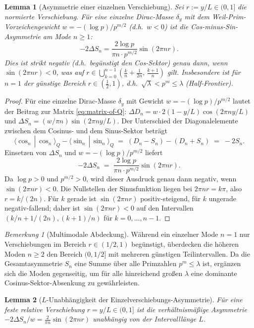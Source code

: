 \documentclass[11pt,a4paper]{article}
\newtheorem{lemma}[lemma]{Lemma}
\theoremstyle{remark}
\newtheorem{remark}[remark]{Bemerkung}
\theoremstyle{plain}
\begin{document}
\begin{lemma}[Asymmetrie einer einzelnen Verschiebung]
\label{lem:shift-parity-cvs}
Sei $r:=y/L\in(0,1]$ die normierte Verschiebung. Für eine einzelne Dirac-Masse $\delta_y$ mit dem Weil-Prim-Vorzeichengewicht $w=-(\log p)/p^{m/2}$ (d.h.\ $w<0$) ist die Cos-minus-Sin-Asymmetrie am Mode $n\geq 1$:
\[
  -2\Delta S_n = \frac{2\log p}{\pi n\cdot p^{m/2}}\sin(2\pi n r).
\]
Dies ist \emph{strikt negativ} (d.h.\ begünstigt den Cos-Sektor) genau dann, wenn $\sin(2\pi n r)<0$, was auf $r\in \bigcup_{k=0}^{n-1}(\tfrac{k}{n}+\tfrac{1}{2n},\,\tfrac{k+1}{n})$ gilt. Insbesondere ist für $n=1$ der günstige Bereich $r\in(\tfrac{1}{2},1)$, d.h.\ $\sqrt\lambda<p^m\le\lambda$ (Half-Frontier).
\end{lemma}

\begin{proof}
Für eine einzelne Dirac-Masse $\delta_y$ mit Gewicht $w = -(\log p)/p^{m/2}$ lautet der Beitrag zur Matrix \eqref{eq:matrix-of-Q}:
$\Delta D_n = w \cdot 2(1-y/L)\cos(2\pi n y/L)$ und $\Delta S_n = (w/\pi n)\sin(2\pi n y/L)$.
Der Unterschied der Diagonalelemente zwischen dem Cosinus- und dem Sinus-Sektor beträgt
\[
  \langle \cos_n \,|\, \cos_n \rangle_Q - \langle \sin_n \,|\, \sin_n \rangle_Q
  \;=\; (D_n - S_n) - (D_n + S_n)
  \;=\; -2 S_n.
\]
Einsetzen von $\Delta S_n$ und $w = -(\log p)/p^{m/2}$ liefert
\[
  -2\Delta S_n \;=\; \frac{2\log p}{\pi n\cdot p^{m/2}}\sin(2\pi n r).
\]
Da $\log p > 0$ und $p^{m/2} > 0$, wird dieser Ausdruck genau dann negativ, wenn $\sin(2\pi n r) < 0$. Die Nullstellen der Sinusfunktion liegen bei $2\pi n r = k\pi$, also $r = k/(2n)$. Für $k$ gerade ist $\sin(2\pi n r)$ positiv-steigend, für $k$ ungerade negativ-fallend; daher ist $\sin(2\pi n r) < 0$ auf den Intervallen $(k/n + 1/(2n), (k+1)/n)$ für $k=0, \dots, n-1$.
\end{proof}

\begin{remark}[Multimodale Abdeckung]
\label{rem:multi-mode-coverage}
Während ein einzelner Mode $n=1$ nur Verschiebungen im Bereich $r\in(1/2, 1)$ begünstigt, überdecken die höheren Moden $n\ge 2$ den Bereich $(0, 1/2]$ mit mehreren günstigen Teilintervallen. Da die Gesamtasymmetrie $S_n$ eine Summe über alle Primzahlen $p^m \le \lambda$ ist, ergänzen sich die Moden gegenseitig, um für alle hinreichend großen $\lambda$ eine dominante Cosinus-Sektor-Absenkung zu gewährleisten.
\end{remark}

\begin{lemma}[$L$-Unabhängigkeit der Einzelverschiebungs-Asymmetrie]
\label{lem:L-independence-cvs}
Für eine feste relative Verschiebung $r = y/L \in (0,1]$ ist die verhältnismäßige Asymmetrie $-2\Delta S_n / w = \frac{2}{\pi n}\sin(2\pi n r)$ unabhängig von der Intervalllänge $L$.
\end{lemma}
\end{document}

